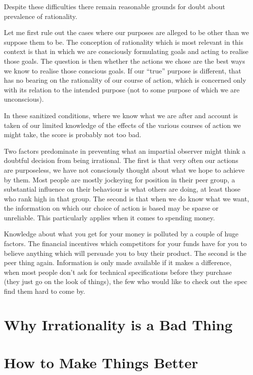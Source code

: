 Despite these difficulties there remain reasonable grounds for doubt about prevalence of rationality.

Let me first rule out the cases where our purposes are alleged to be other than we suppose them to be.
The conception of rationality which is most relevant in this context is that in which we are consciously formulating goals and acting to realise those goals.
The question is then whether the actions we chose are the best ways we know to realise those conscious goals.
If our ``true'' purpose is different, that has no bearing on the rationality of our course of action, which is concerned only with its relation to the intended purpose (not to some purpose of which we are unconscious).

In these sanitized conditions, where we know what we are after and account is taken of our limited knowledge of the effects of the various courses of action we might take, the score is probably not too bad.

Two factors predominate in preventing  what an impartial observer might think a doubtful decision from being irrational.
The first is that very often our actions are purposeless, we have not consciously thought about what we hope to achieve by them.
Most people are mostly jockeying for position in their peer group, a substantial influence on their behaviour is what others are doing, at least those who rank high in that group.
The second is that when we do know what we want, the information on which our choice of action is based may be sparse or unreliable.
This particularly applies when it comes to spending money.

Knowledge about what you get for your money is polluted by a couple of huge factors.
The financial incentives which competitors for your funds have for you to believe anything which will persuade you to buy their product.
The second is the peer thing again.
Information is only made available if it makes a difference, when most people don't ask for technical specifications before they purchase (they just go on the look of things), the few who would like to check out the spec find them hard to come by.

\section{Why Irrationality is a Bad Thing}

\section{How to Make Things Better}
